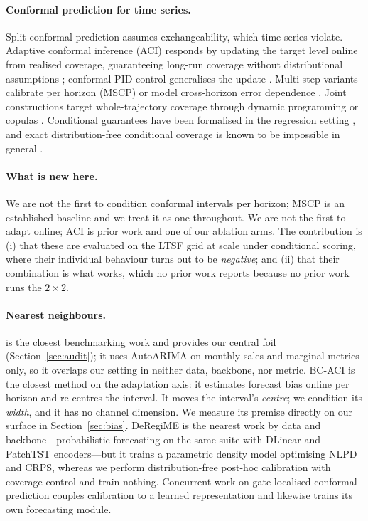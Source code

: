 \documentclass[11pt]{article}
\begin{document}
\paragraph{Conformal prediction for time series.} Split conformal prediction assumes exchangeability, which time series violate. Adaptive conformal inference (ACI) responds by updating the target level online from realised coverage, guaranteeing long-run coverage without distributional assumptions \citep{aci}; conformal PID control generalises the update \citep{cpid}. Multi-step variants calibrate per horizon (MSCP) or model cross-horizon error dependence \citep{acmcp,o2cp}. Joint constructions target whole-trajectory coverage through dynamic programming \citep{bellman} or copulas \citep{copulacpts}. Conditional guarantees have been formalised in the regression setting \citep{gcc}, and exact distribution-free conditional coverage is known to be impossible in general \citep{gcc}.

\paragraph{What is new here.} We are not the first to condition conformal intervals per horizon; MSCP is an established baseline and we treat it as one throughout. We are not the first to adapt online; ACI is prior work and one of our ablation arms. The contribution is (i) that these are evaluated on the LTSF grid at scale under conditional scoring, where their individual behaviour turns out to be \emph{negative}; and (ii) that their combination is what works, which no prior work reports because no prior work runs the $2\times2$.

\paragraph{Nearest neighbours.} \citet{cpsurvey} is the closest benchmarking work and provides our central foil (Section~\ref{sec:audit}); it uses AutoARIMA on monthly sales and marginal metrics only, so it overlaps our setting in neither data, backbone, nor metric. BC-ACI \citep{bcaci} is the closest method on the adaptation axis: it estimates forecast bias online per horizon and re-centres the interval. It moves the interval's \emph{centre}; we condition its \emph{width}, and it has no channel dimension. We measure its premise directly on our surface in Section~\ref{sec:bias}. DeRegiME \citep{deregime} is the nearest work by data and backbone---probabilistic forecasting on the same suite with DLinear and PatchTST encoders---but it trains a parametric density model optimising NLPD and CRPS, whereas we perform distribution-free post-hoc calibration with coverage control and train nothing. Concurrent work on gate-localised conformal prediction \citep{glcp} couples calibration to a learned representation and likewise trains its own forecasting module.
\end{document}
